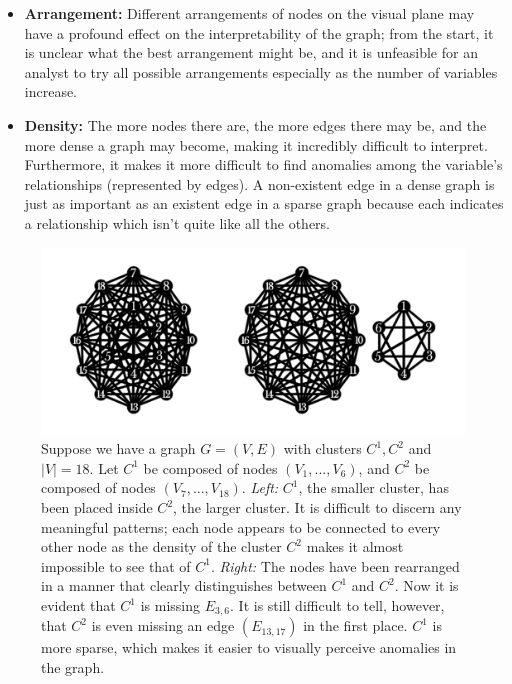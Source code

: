\tablespacing
\begin{itemize}
	\item \textbf{Arrangement:} Different arrangements of nodes on the visual 
	plane may have a profound effect on the interpretability of the graph; from 
	the start, it is unclear what the best arrangement might be, and it is 
	unfeasible for an analyst to try all possible arrangements 
	especially as the number of variables increase.
	
	\item \textbf{Density:} The more nodes there are, the more edges there may 
	be, and the more dense a graph may become, making it incredibly difficult 
	to interpret. Furthermore, it makes it more difficult to find anomalies 
	among the variable's relationships (represented by edges). A non-existent 
	edge in a dense graph is just as important as an existent edge in a sparse 
	graph because each indicates a relationship which isn't quite like all the 
	others.
\end{itemize}
\bodyspacing

\begin{figure}[htb]
	\begin{center}
		\includegraphics[width=1\linewidth]{ch-gc/figures/arr_density}
		\caption[Difficulties with graph visualization.]{
		Suppose we have a graph $G=(V,E)$ with clusters $C^1,C^2$ and $|V|=18$. 
		Let $C^1$ be composed of nodes $(V_1,...,V_6)$, and $C^2$ be composed 
		of nodes $(V_7,...,V_{18})$. 
		\textit{Left:} $C^1$, the smaller cluster, has been placed inside 
		$C^2$, the larger cluster. It is difficult to discern any meaningful 
		patterns; each node appears to be connected to every other node as the 
		density of the cluster $C^2$ makes it almost impossible to see that of 
		$C^1$.
		\textit{Right:} The nodes have been rearranged in a manner that clearly 
		distinguishes between $C^1$ and $C^2$. Now it is evident 
		that $C^1$ is missing $E_{3,6}$. It is still difficult to tell, 
		however, that 
		$C^2$ is even missing an edge $(E_{13,17})$ in the first place.
		$C^1$ is more sparse, which makes it easier to visually perceive 
		anomalies in the graph.}
		\label{fig:gc:arr_density}
	\end{center}
\end{figure}

